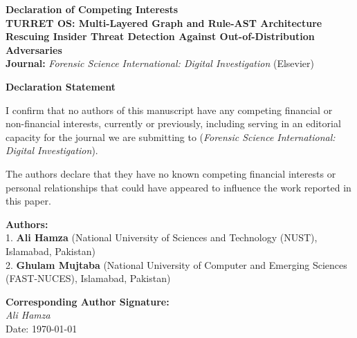 \documentclass[11pt,a4paper]{article}
\begin{document}
\begin{center}
    {\Large \textbf{Declaration of Competing Interests}} \\[1.2em]
    \textbf{TURRET OS: Multi-Layered Graph and Rule-AST Architecture Rescuing Insider Threat Detection Against Out-of-Distribution Adversaries} \\[1em]
    \textbf{Journal:} \textit{Forensic Science International: Digital Investigation} (Elsevier)
\end{center}

\vspace{1.5em}

\textbf{Declaration Statement}

I confirm that no authors of this manuscript have any competing financial or non-financial interests, currently or previously, including serving in an editorial capacity for the journal we are submitting to (\textit{Forensic Science International: Digital Investigation}).

The authors declare that they have no known competing financial interests or personal relationships that could have appeared to influence the work reported in this paper.

\vspace{2em}

\textbf{Authors:} \\
1. \textbf{Ali Hamza} (National University of Sciences and Technology (NUST), Islamabad, Pakistan) \\
2. \textbf{Ghulam Mujtaba} (National University of Computer and Emerging Sciences (FAST-NUCES), Islamabad, Pakistan)

\vspace{2em}

\textbf{Corresponding Author Signature:} \\[1em]
\textit{Ali Hamza} \\
Date: \today
\end{document}
